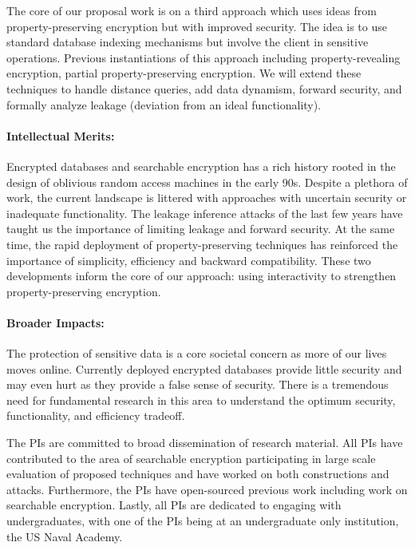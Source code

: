\documentclass[11pt]{article}
\begin{document}
The core of our proposal work is on a third approach which uses ideas from property-preserving encryption but with improved security.  The idea is to use standard database indexing mechanisms but involve the client in sensitive operations.  Previous instantiations of this approach including property-revealing encryption, partial property-preserving encryption.  We will extend these techniques to handle distance queries, add data dynamism, forward security, and formally analyze leakage (deviation from an ideal functionality).

\paragraph{Intellectual Merits:}  

Encrypted databases and searchable encryption has a rich history rooted in the design of oblivious random access machines in the early 90s.  Despite a plethora of work, the current landscape is littered with approaches with uncertain security or inadequate functionality.  The leakage inference attacks of the last few years have taught us the importance of limiting leakage and forward security.  At the same time, the rapid deployment of property-preserving techniques has reinforced the importance of simplicity, efficiency and backward compatibility.  These two developments inform the core of our approach: using interactivity to strengthen property-preserving encryption.

\paragraph{Broader Impacts:}

The protection of sensitive data is a core societal concern as more of our lives moves online.  Currently deployed encrypted databases provide little security and may even hurt as they provide a false sense of security.  There is a tremendous need for fundamental research in this area to understand the optimum security, functionality, and efficiency tradeoff.

The PIs are committed to broad dissemination of research material.  All PIs have contributed to the area of searchable encryption participating in large scale evaluation of proposed techniques and have worked on both constructions and attacks.  Furthermore, the PIs have open-sourced previous work including work on searchable encryption.  Lastly, all PIs are dedicated to engaging with undergraduates, with one of the PIs being at an undergraduate only institution, the US Naval Academy.
\end{document}
